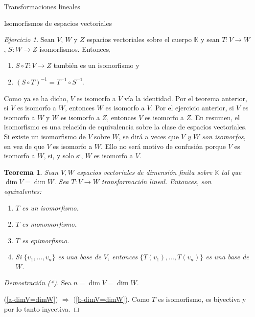 \documentclass[a4paper,12pt,twoside,spanish,reqno]{amsbook}
\numberwithin{equation}{section}
\newtheorem{teorema}{Teorema}[section]
\theoremstyle{definition}
\theoremstyle{remark}
\newtheorem*{ejercicio*}{Ejercicio}
\newcommand{\K}{\mathbb K}
\begin{document}
\begin{chapter}{Transformaciones lineales}
\begin{section}{Isomorfismos de espacios vectoriales}
        
        \begin{ejercicio*} 
            Sean $V$, $W$ y $Z$ espacios vectoriales sobre el cuerpo $\K$ y sean $T:V \to W$, $S:W \to Z$ isomorfismos. Entonces, 
            \begin{enumerate}
                \item $S\circ T:V \to Z$  también es un isomorfismo y
                \item 	$(S\circ T)^{-1} = T^{-1}\circ S^{-1}$.
            \end{enumerate}
        \end{ejercicio*}
        
        
        Como ya se ha dicho, $V$ es isomorfo a $V$ vía la identidad. Por  el teorema anterior, si $V$ es isomorfo a $W$,  entonces $W$ es isomorfo a $V$. Por  el ejercicio anterior, si $V$ es isomorfo a $W$ y $W$ es isomorfo a $Z$, entonces $V$ es isomorfo a $Z$. En resumen, el isomorfismo es una relación de equivalencia sobre la clase de espacios vectoriales. Si existe un isomorfismo de $V$ sobre $W$, se dirá a veces que \textit{$V$ y $W$ son isomorfos}, en vez de que $V$ es isomorfo a $W$. Ello no será motivo de confusión porque $V$ es isomorfo a $W$, si, y solo si, $W$ es isomorfo a $V$.	
            
        
            
            
        \begin{teorema}
            Sean $V,W$ espacios vectoriales de dimensión  finita sobre $\K$ tal que $\dim V = \dim W$. Sea $T: V \to W$ transformación lineal. Entonces,  son equivalentes:
            \begin{enumerate}[label=(\alph*),ref=\alph*]
                \item\label{a-dimV=dimW} $T$ es un  isomorfismo.
                \item\label{b-dimV=dimW} $T$ es monomorfismo.
                \item\label{c-dimV=dimW} $T$ es epimorfismo.
                \item\label{d-dimV=dimW} Si $\{v_1,\ldots,v_n \}$ es una base de $V$,  entonces $\{T(v_1),\ldots,T(v_n) \}$ es una base de $W$.
            \end{enumerate}
        \end{teorema}
        \begin{proof}[Demostración (*)] Sea $n = \dim V = \dim W$.
            
            
            (\ref{a-dimV=dimW}) $\Rightarrow$ (\ref{b-dimV=dimW}). Como $T$ es isomorfismo,  es biyectiva y por lo tanto inyectiva.
            

\end{proof}
\end{section}
\end{chapter}
\end{document}

